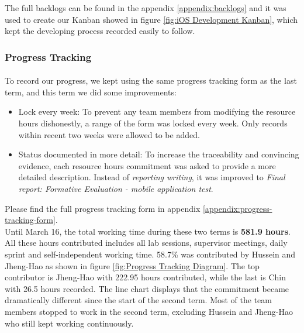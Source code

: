 \documentclass[12pt,a4paper]{article}
\begin{document}
          The full backlogs can be found in the appendix \ref{appendix:backlogs} and it was used to create our Kanban showed in figure \ref{fig:iOS Development Kanban}, which kept the developing process recorded easily to follow.        
          
        \subsubsection{Progress Tracking}
          \paragraph{}To record our progress, we kept using the same progress tracking form as the last term, and this term we did some improvements:

          \begin{itemize}
            \item {Lock every week}: To prevent any team members from modifying the resource hours dishonestly, a range of the form was locked every week. Only records within recent two weeks were allowed to be added. 
            \item {Status documented in more detail}: To increase the traceability and convincing evidence, each resource hours commitment was asked to provide a more detailed description. Instead of {\it reporting writing}, it was improved to {\it Final report: Formative Evaluation - mobile application test}.
          \end{itemize}

          Please find the full progress tracking form in appendix \ref{appendix:progress-tracking-form}.\\
          
          Until March 16, the total working time during these two terms is {\bf 581.9 hours}. All these hours contributed includes all lab sessions, supervisor meetings, daily sprint and self-independent working time. 58.7\% was contributed by Hussein and Jheng-Hao as shown in figure \ref{fig:Progress Tracking Diagram}. The top contributor is Jheng-Hao with 222.95 hours contributed, while the last is Chin with 26.5 hours recorded. The line chart displays that the commitment became dramatically different since the start of the second term. Most of the team members stopped to work in the second term, excluding Hussein and Jheng-Hao who still kept working continuously.
          
\end{document}

